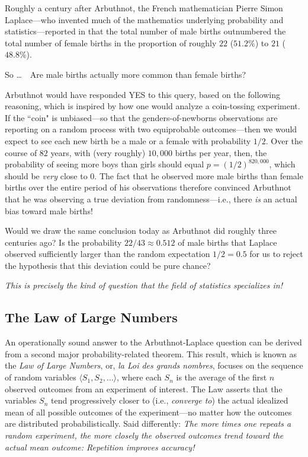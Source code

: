 \smallskip

Roughly a century after Arbuthnot, the French mathematician Pierre Simon Laplace---who invented much of the mathematics underlying probability and statistics---reported in \cite{Laplace} that the total number of male births outnumbered the total number of female births in the proportion of roughly $22$ ($51.2\%$) to $21$ ($48.8\%$).

\medskip

\noindent
So \ldots \ \ Are male births actually more common than female births?

\medskip

\noindent
Arbuthnot would have responded YES to this query, based on the following reasoning, which is inspired by how one would analyze a coin-tossing experiment.  If the ``coin" is unbiased---so that the genders-of-newborns observations are reporting on a random process with two equiprobable outcomes---then we would expect to see each new birth be a male or a female with probability $1/2$.  Over the course of $82$ years, with (very roughly) $10,000$ births per year, then, the probability of seeing more boys than girls should equal $p=(1/2)^{820,000}$, which should be {\em very} close to $0$.  The fact that he observed more male births than female births over the entire period of his observations therefore convinced Arbuthnot that he was observing a true deviation from randomness---i.e., there {\em is} an actual bias toward male births!

\medskip

Would we draw the same conclusion today as Arbuthnot did roughly three centuries ago?  Is the probability $22/43 \approx 0.512$ of male births that Laplace observed sufficiently larger than the random expectation $1/2 = 0.5$ for us to reject the hypothesis that this deviation could be pure chance?

\medskip

{\em This is precisely the kind of question that the field of statistics specializes in!}

\subsection{The Law of Large Numbers}
\label{sec:Large-Numbers}

 

An operationally sound answer to the Arbuthnot-Laplace question can be derived from a second major probability-related theorem.  This result, which is known as the {\it Law of Large Numbers}, or, {\it la Loi des grands nombres}, focuses on the sequence of random variables $\langle S_1, S_2, \ldots \rangle$, where each $S_n$ is the average of the first $n$ observed outcomes from an experiment of interest.  The Law asserts that the variables $S_n$ tend progressively closer to (i.e., {\em converge to}) the actual idealized mean of all possible outcomes of the experiment---no matter how the outcomes are distributed probabilistically.  Said differently: {\em The more times one repeats a random experiment, the more closely the observed outcomes trend toward the actual mean outcome:  Repetition improves accuracy!}

